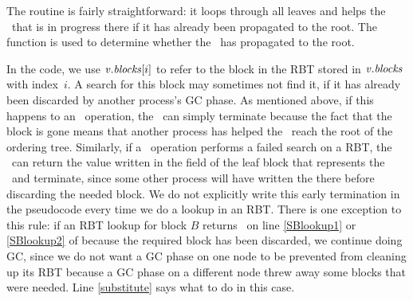 The  routine is fairly straightforward:  it loops through all leaves and
helps the \dequeue\ that is in progress there if it has already been propagated to the root.
The  function is used to determine whether the \dequeue\ has propagated to the root.

In the code, we use $\mbox{\textnormal{\textit{v}}}.\mbox{\textit{blocks}}[i]$ to refer to the block in the RBT stored in $\mbox{\textnormal{\textit{v}}}.\mbox{\textit{blocks}}$
with index~$i$.
A search for this block may sometimes not find it, if it has already been discarded
by another process's GC phase.
As mentioned above, if this happens to an \enqueue\ operation,
the \enqueue\ can simply terminate because the fact that the block is gone means that another
process has helped the \enqueue\ reach the root of the ordering tree.
Similarly, if  a \dequeue\ operation performs a failed search on a RBT, the \dequeue\ can return the value 
written in the  field of the 
leaf block that represents the \dequeue\ and terminate, since some other process
will have written the  there before discarding the needed block.
We do not explicitly write this early termination in the pseudocode every time we do a lookup in an RBT.
There is one exception to this rule:  if an RBT lookup for block $B$ returns \nl\
on line \ref{SBlookup1} or \ref{SBlookup2} of
 because the required block has been discarded, 
we continue doing GC, since we do not want a GC phase on one node
to be prevented from cleaning up its RBT because a GC phase on a different node threw away some blocks
that were needed.
Line \ref{substitute} says what to do in this case.
